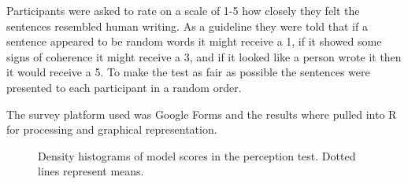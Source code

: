 \documentclass[a4paper,12pt]{article}
\begin{document}
Participants were asked to rate on a scale of 1-5 how closely they felt the sentences resembled human writing. As a guideline they were told that if a sentence appeared to be random words it might receive a 1, if it showed some signs of coherence it might receive a 3, and if it looked like a person wrote it then it would receive a 5. To make the test as fair as possible the sentences were presented to each participant in a random order. 

The survey platform used was Google Forms and the results where pulled into R for processing and graphical representation.



\begin{figure}
  \centering
    \qquad
    \caption{Density histograms of model scores in the perception test. Dotted lines represent means.}%
    \label{fig:histograms}%
\end{figure}
\end{document}
